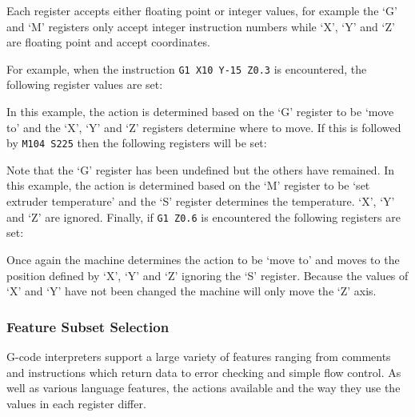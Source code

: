 				Each register accepts either floating point or integer values, for
				example the `G' and `M' registers only accept integer instruction
				numbers while `X', `Y' and `Z' are floating point and accept
				coordinates.
				
				For example, when the instruction \verb|G1 X10 Y-15 Z0.3| is
				encountered, the following register values are set:
				
				\begin{gcoderegs}
				\end{gcoderegs}
				
				In this example, the action is determined based on the `G' register to
				be `move to' and the `X', `Y' and `Z' registers determine where to move.
				If this is followed by \verb|M104 S225| then the following registers
				will be set:
				
				\begin{gcoderegs}
					\reg{M}{104}
					\reg{S}{225}
					\reg{X}{10}
					\reg{Y}{-15}
					\reg{Z}{0.3}
				\end{gcoderegs}
				
				Note that the `G' register has been undefined but the others have
				remained. In this example, the action is determined based on the `M'
				register to be `set extruder temperature' and the `S' register
				determines the temperature. `X', `Y' and `Z' are ignored. Finally, if
				\verb|G1 Z0.6| is encountered the following registers are set:
				
				\begin{gcoderegs}
					\reg{G}{1}
					\reg{Z}{0.6}
				\end{gcoderegs}
				
				Once again the machine determines the action to be `move to' and moves
				to the position defined by `X', `Y' and `Z' ignoring the `S' register.
				Because the values of `X' and `Y' have not been changed the machine will
				only move the `Z' axis.
			
			\subsubsection{Feature Subset Selection}
				
				G-code interpreters support a large variety of features ranging from
				comments and instructions which return data to error checking and simple
				flow control. As well as various language features, the actions
				available and the way they use the values in each register differ.
				
